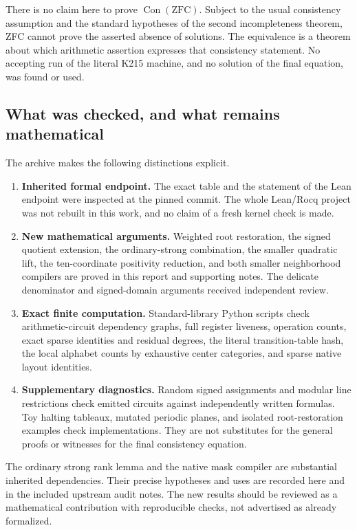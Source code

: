 \documentclass[11pt,a4paper]{article}
\theoremstyle{remark}\newtheorem{remark}[theorem]{Remark}
\newcommand{\Con}{\operatorname{Con}}
\begin{document}
There is no claim here to prove $\Con(\mathrm{ZFC})$. Subject to
the usual consistency assumption and the standard hypotheses of
the second incompleteness theorem, ZFC cannot prove the asserted
absence of solutions. The equivalence is a theorem about which
arithmetic assertion expresses that consistency statement.
No accepting run of the literal K215 machine, and no solution of
the final equation, was found or used.

\subsection{What was checked, and what remains mathematical}

The archive makes the following distinctions explicit.
\begin{enumerate}
\item \textbf{Inherited formal endpoint.}
The exact table and the statement of the Lean endpoint were inspected
at the pinned commit. The whole Lean/Rocq project was not rebuilt
in this work, and no claim of a fresh kernel check is made.
\item \textbf{New mathematical arguments.}
Weighted root restoration, the signed quotient extension, the
ordinary-strong combination, the smaller quadratic lift, the
ten-coordinate positivity reduction, and both smaller neighborhood
compilers are proved in this report and supporting notes.
The delicate denominator and signed-domain arguments received
independent review.
\item \textbf{Exact finite computation.}
Standard-library Python scripts check arithmetic-circuit dependency
graphs, full register liveness, operation counts, exact sparse
identities and residual degrees, the literal transition-table hash,
the local alphabet counts by exhaustive center categories, and
sparse native layout identities.
\item \textbf{Supplementary diagnostics.}
Random signed assignments and modular line restrictions check emitted
circuits against independently written formulas. Toy halting tableaux,
mutated periodic planes, and isolated root-restoration examples check
implementations. They are not substitutes for the general proofs or
witnesses for the final consistency equation.
\end{enumerate}
The ordinary strong rank lemma and the native mask compiler are
substantial inherited dependencies. Their precise hypotheses and
uses are recorded here and in the included upstream audit notes.
The new results should be reviewed as a mathematical contribution
with reproducible checks, not advertised as already formalized.
\end{document}
